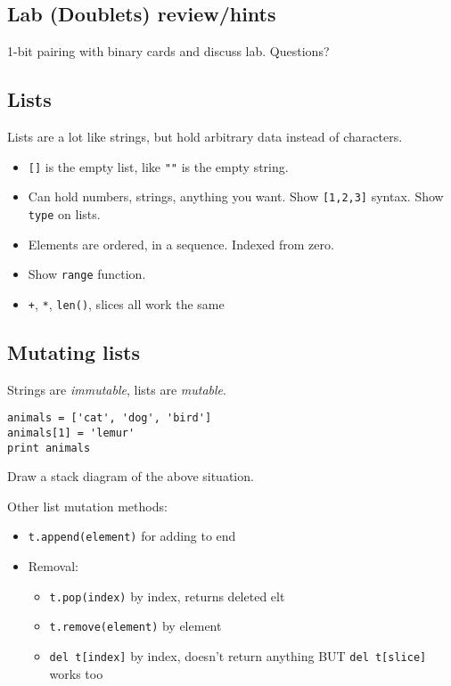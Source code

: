 \documentclass{article}
\begin{document}
\subsection*{Lab (Doublets) review/hints}

1-bit pairing with binary cards and discuss lab.  Questions?

\subsection*{Lists}

Lists are a lot like strings, but hold arbitrary data instead of
characters.
\begin{itemize}
\item \verb|[]| is the empty list, like \verb|""| is the empty string.
\item Can hold numbers, strings, anything you want.  Show
  \verb|[1,2,3]| syntax.  Show \verb|type| on lists.
\item Elements are ordered, in a sequence.  Indexed from zero.
\item Show \verb|range| function.
\item \verb|+|, \verb|*|, \verb|len()|, slices all work the same
\end{itemize}

\subsection*{Mutating lists}

Strings are \emph{immutable}, lists are \emph{mutable}.

\begin{verbatim}
animals = ['cat', 'dog', 'bird']
animals[1] = 'lemur'
print animals
\end{verbatim}
Draw a stack diagram of the above situation.

Other list mutation methods:
\begin{itemize}
\item \verb|t.append(element)| for adding to end
\item Removal:
  \begin{itemize}
  \item \verb|t.pop(index)| by index, returns deleted elt
  \item \verb|t.remove(element)| by element
  \item \verb|del t[index]| by index, doesn't return anything BUT
	\verb|del t[slice]| works too
  \end{itemize}
\end{itemize}
\end{document}
